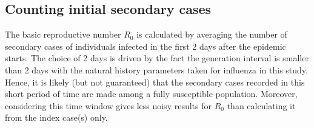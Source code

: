\documentclass[10pt,twocolumn]{article}
\begin{document}
\subsection*{Counting initial secondary cases}
The basic reproductive number $R_0$ is calculated by averaging the number of secondary cases of individuals infected in the first 2 days after the epidemic starts. 
The choice of 2 days is driven by the fact the generation interval is smaller than 2 days with the natural history parameters taken for influenza in this study. Hence, it is likely (but not guaranteed) that the secondary cases recorded in this short period of time are made among a fully susceptible population. 
Moreover, considering this time window gives less noisy results for $R_0$ than calculating it from the index case(s) only.
\end{document}
